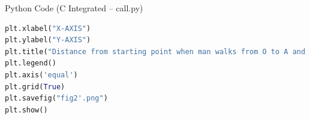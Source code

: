 \documentclass{beamer}
\begin{document}
\begin{frame}[fragile]{Python Code (C Integrated – call.py)
}
\begin{lstlisting}[language=Python]
plt.xlabel("X-AXIS")
plt.ylabel("Y-AXIS")
plt.title("Distance from starting point when man walks from O to A and from A to B")
plt.legend()
plt.axis('equal')
plt.grid(True)
plt.savefig("fig2'.png")
plt.show()
\end{lstlisting}
\end{frame}
\end{document}
